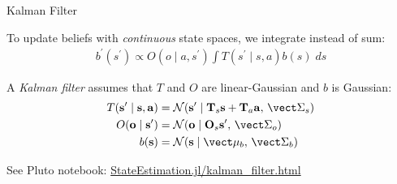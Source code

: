 \begin{frame}[fragile]{Kalman Filter}

To update beliefs with \textit{continuous} state spaces, we integrate instead of sum:
\begin{gather*}
    b^\prime(s^\prime) \propto O(o \mid a, s^\prime)\int T(s^\prime \mid s, a)b(s)\;ds    
\end{gather*}

A \textit{Kalman filter} assumes that $T$ and $O$ are linear-Gaussian and $b$ is Gaussian:
\begin{align*}
    T(\mathbf{s}^\prime \mid \mathbf s, \mathbf a) &= \mathcal{N}(\mathbf{s}^\prime \mid \mathbf{T}_s \mathbf{s} + \mathbf{T}_a \mathbf{a},\, \mat{\Sigma}_s)\\
    O(\mathbf o \mid \mathbf{s}^\prime) &= \mathcal{N}(\mathbf o \mid \mathbf{O}_s \mathbf{s}^\prime,\, \mat{\Sigma}_o)\\
    b(\mathbf{s}) &= \mathcal{N}(\mathbf{s} \mid \vec{\mu}_b,\, \mat{\Sigma}_b)
\end{align*}


See Pluto notebook: \href{http://htmlview.glitch.me/?https://raw.githubusercontent.com/mossr/StateEstimation.jl/master/html/kalman_filter.html}{\color{cardinal}StateEstimation.jl/kalman\_filter.html}

\end{frame}